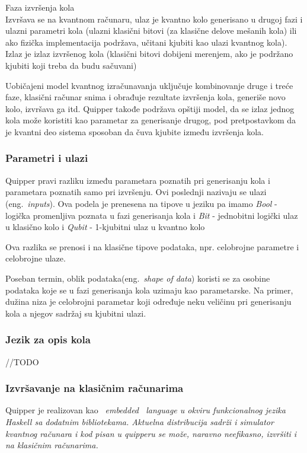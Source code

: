 \documentclass[a4paper]{article}
\begin{document}
{Faza izvršenja kola\\
Izvršava se na kvantnom računaru, ulaz je kvantno kolo generisano u drugoj fazi i ulazni parametri kola (ulazni klasični bitovi (za klasične delove mešanih kola) ili ako fizička implementacija podržava, učitani kjubiti kao ulazi kvantnog kola). Izlaz je izlaz izvršenog kola (klasični bitovi dobijeni merenjem, ako je podržano kjubiti koji treba da budu sačuvani)

Uobičajeni model kvantnog izračunavanja uključuje kombinovanje druge i treće faze, klasični računar snima i obrađuje rezultate izvršenja kola, generiše novo kolo, izvršava ga itd. Quipper takođe podržava opštiji model, da se izlaz jednog kola može koristiti kao parametar za generisanje drugog, pod pretpostavkom da je kvantni deo sistema sposoban da čuva kjubite između izvršenja kola.

\subsubsection{Parametri i ulazi}

Quipper pravi razliku između parametara poznatih pri generisanju kola i parametara poznatih samo pri izvršenju. Ovi poslednji nazivaju se ulazi (eng.~\emph{inputs}). Ova podela je prenesena na tipove u jeziku pa imamo \emph{Bool} - logička promenljiva poznata u fazi generisanja kola i \emph{Bit} - jednobitni logički ulaz u klasično kolo i \emph{Qubit} - 1-kjubitni ulaz u kvantno kolo

Ova razlika se prenosi i na klasične tipove podataka, npr. celobrojne parametre i celobrojne ulaze.

Poseban termin, oblik podataka(eng.~\emph{shape of data}) koristi se za osobine podataka koje se u fazi generisanja kola uzimaju kao parametarske. Na primer, dužina niza je celobrojni parametar koji određuje neku veličinu pri generisanju kola a njegov sadržaj su kjubitni ulazi.

\subsubsection{Jezik za opis kola}

//TODO


\subsubsection{Izvršavanje na klasičnim računarima}
\label{sec:quipperizvrsavanje}

Quipper je realizovan kao ~\em embedded ~\em language u okviru funkcionalnog jezika Haskell sa dodatnim bibliotekama. Aktuelna distribucija sadrži i simulator kvantnog računara i kod pisan u quipperu se može, naravno neefikasno, izvršiti i na klasičnim računarima.

}
\end{document}
